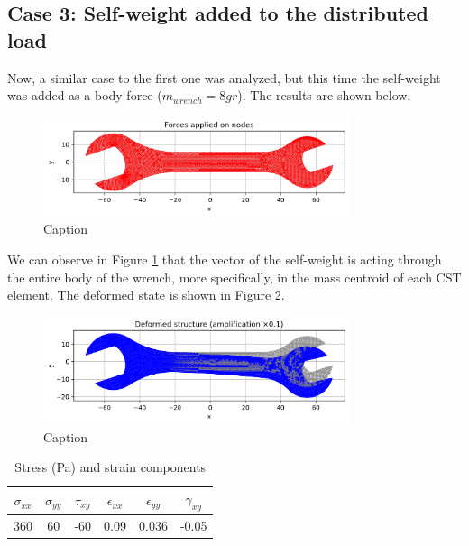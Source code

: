 \subsection{Case 3: Self-weight added to the distributed load}

Now, a similar case to the first one was analyzed, but this time the self-weight was added as a body force ($m_{wrench} = 8 gr$). The results are shown below.

\begin{figure}[H]
    \centering
    \includegraphics[width=0.8\textwidth]{GRAFICOS/Case c_fuerzas.png}
    \caption{Caption}
    \label{fig:xdiwi}
\end{figure}

We can observe in Figure \ref{fig:xdiwi} that the vector of the self-weight is acting through the entire body of the wrench, more specifically, in the mass centroid of each CST element. The deformed state is shown in Figure \ref{fig:xdiwi2}.

\begin{figure}[H]
    \centering
    \includegraphics[width=0.8\textwidth]{GRAFICOS/Case c_deformada.png}
    \caption{Caption}
    \label{fig:xdiwi2}
\end{figure}

\begin{table}[H]
    \centering
    \caption{Stress (Pa) and strain components}
    \begin{tabular}{|c|c|c|c|c|c|}
    \hline
    $\sigma_{xx}$ & $\sigma_{yy}$ & $\tau_{xy}$ & $\epsilon_{xx}$ & $\epsilon_{yy}$ & $\gamma_{xy}$ \\
    \hline
    360 & 60 & -60 & 0.09 & 0.036 & -0.05 \\
    \hline
    \end{tabular}
    \label{tab:tabla1}
\end{table}
    
